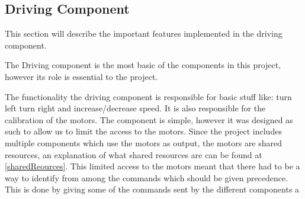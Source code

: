 \subsection{Driving Component}
This section will describe the important features implemented in the driving component. 

The Driving component is the most basic of the components in this project, however its role is essential to the project.

The functionality the driving component is responsible for basic stuff like: turn left turn right and increase/decrease speed. It is also responsible for the calibration of the motors. The component is simple, however it was designed as such to allow us to limit the access to the motors. Since the project includes multiple components which use the motors as output, the motors are shared resources, an explanation of what shared resources are can be found at \ref{sharedReources}. This limited access to the motors meant that there had to be a way to identify from among the commands which should be given precedence. This is done by giving some of the commands sent by the different components a 




